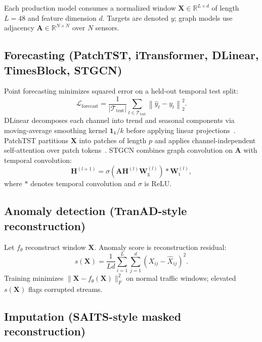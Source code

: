 
Each production model consumes a normalized window $\mathbf{X}\in\mathbb{R}^{L\times d}$ of length $L=48$ and feature dimension $d$. Targets are denoted $y$; graph models use adjacency $\mathbf{A}\in\mathbb{R}^{N\times N}$ over $N$ sensors.

\subsection{Forecasting (PatchTST, iTransformer, DLinear, TimesBlock, STGCN)}

Point forecasting minimizes squared error on a held-out temporal test split:
\begin{equation}
\label{eq:forecast_loss}
\mathcal{L}_{\mathrm{forecast}} = \frac{1}{|\mathcal{T}_{\mathrm{test}}|}\sum_{t\in\mathcal{T}_{\mathrm{test}}}\left\|\hat{y}_t - y_t\right\|_2^2 .
\end{equation}
DLinear decomposes each channel into trend and seasonal components via moving-average smoothing kernel $\mathbf{1}_k/k$ before applying linear projections~\cite{zeng2023transformers}. PatchTST partitions $\mathbf{X}$ into patches of length $p$ and applies channel-independent self-attention over patch tokens~\cite{nie2023patchtst}. STGCN combines graph convolution on $\mathbf{A}$ with temporal convolution:
\begin{equation}
\label{eq:stgcn}
\mathbf{H}^{(l+1)} = \sigma\!\left(\mathbf{A}\mathbf{H}^{(l)}\mathbf{W}^{(l)}_{\mathrm{g}}\right) * \mathbf{W}^{(l)}_{\mathrm{t}},
\end{equation}
where $*$ denotes temporal convolution and $\sigma$ is ReLU.

\subsection{Anomaly detection (TranAD-style reconstruction)}

Let $f_\theta$ reconstruct window $\mathbf{X}$. Anomaly score is reconstruction residual:
\begin{equation}
\label{eq:tranad_score}
s(\mathbf{X}) = \frac{1}{Ld}\sum_{i=1}^{L}\sum_{j=1}^{d}\left(X_{ij} - \hat{X}_{ij}\right)^2 .
\end{equation}
Training minimizes $\|\mathbf{X} - f_\theta(\mathbf{X})\|_F^2$ on normal traffic windows; elevated $s(\mathbf{X})$ flags corrupted streams.

\subsection{Imputation (SAITS-style masked reconstruction)}

